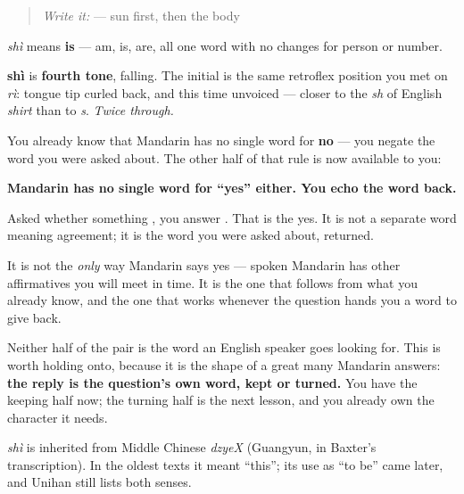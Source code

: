 \label{lesson:ZH-C05-shi}



\begin{quote}
\emph{Write it:}  — sun first, then the body
\end{quote}

\begin{sounds}
\textbf{} \emph{shì} means \textbf{is} — am, is, are, all one word with no changes for person or number.

\textbf{shì} is \textbf{fourth tone}, falling. The initial is the same retroflex position you met on \emph{rì}: tongue tip curled back, and this time unvoiced — closer to the \emph{sh} of English \emph{shirt} than to \emph{s}. \emph{Twice through.}
\end{sounds}

\begin{grammarlens}[title={Grammar Lens: yes by echo}]
You already know that Mandarin has no single word for \textbf{no} — you negate the word you were asked about. The other half of that rule is now available to you:

\textbf{Mandarin has no single word for \textquotedblleft{}yes\textquotedblright{} either. You echo the word back.}

Asked whether something , you answer \textbf{}. That is the yes. It is not a separate word meaning agreement; it is the word you were asked about, returned.

It is not the \emph{only} way Mandarin says yes — spoken Mandarin has other affirmatives you will meet in time. It is the one that follows from what you already know, and the one that works whenever the question hands you a word to give back.

Neither half of the pair is the word an English speaker goes looking for. This is worth holding onto, because it is the shape of a great many Mandarin answers: \textbf{the reply is the question's own word, kept or turned.} You have the keeping half now; the turning half is the next lesson, and you already own the character it needs.
\end{grammarlens}

\begin{cousinweb}
\textbf{} \emph{shì} is inherited from Middle Chinese \emph{dzyeX} (Guangyun, in Baxter's transcription). In the oldest texts it meant \textquotedblleft{}this\textquotedblright{}; its use as \textquotedblleft{}to be\textquotedblright{} came later, and Unihan still lists both senses.
\end{cousinweb}

